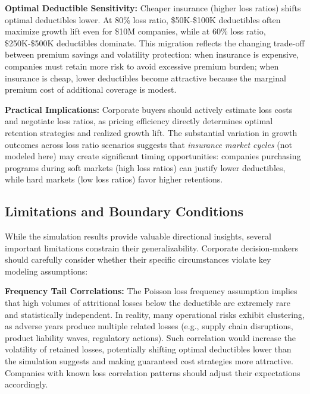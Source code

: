 \documentclass[11pt,letterpaper]{article}
\begin{document}
\vspace{\baselineskip}

\textbf{Optimal Deductible Sensitivity:} Cheaper insurance (higher loss ratios) shifts optimal deductibles lower. At 80\% loss ratio, \$50K-\$100K deductibles often maximize growth lift even for \$10M companies, while at 60\% loss ratio, \$250K-\$500K deductibles dominate. This migration reflects the changing trade-off between premium savings and volatility protection: when insurance is expensive, companies must retain more risk to avoid excessive premium burden; when insurance is cheap, lower deductibles become attractive because the marginal premium cost of additional coverage is modest.

\vspace{\baselineskip}

\textbf{Practical Implications:} Corporate buyers should actively estimate loss costs and negotiate loss ratios, as pricing efficiency directly determines optimal retention strategies and realized growth lift. The substantial variation in growth outcomes across loss ratio scenarios suggests that \emph{insurance market cycles} (not modeled here) may create significant timing opportunities: companies purchasing programs during soft markets (high loss ratios) can justify lower deductibles, while hard markets (low loss ratios) favor higher retentions.

\subsection{Limitations and Boundary Conditions}

While the simulation results provide valuable directional insights, several important limitations constrain their generalizability. Corporate decision-makers should carefully consider whether their specific circumstances violate key modeling assumptions:

\vspace{\baselineskip}

\textbf{Frequency Tail Correlations:} The Poisson loss frequency assumption implies that high volumes of attritional losses below the deductible are extremely rare and statistically independent. In reality, many operational risks exhibit clustering, as adverse years produce multiple related losses (e.g., supply chain disruptions, product liability waves, regulatory actions). Such correlation would increase the volatility of retained losses, potentially shifting optimal deductibles lower than the simulation suggests and making guaranteed cost strategies more attractive. Companies with known loss correlation patterns should adjust their expectations accordingly.
\end{document}
